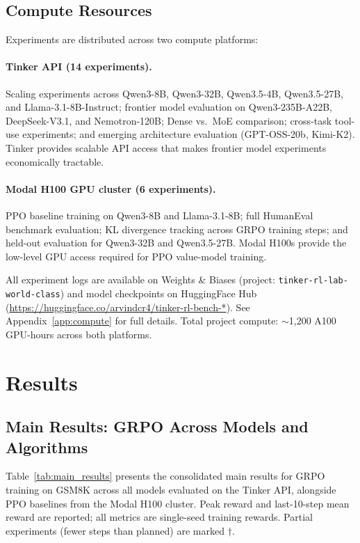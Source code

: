 \documentclass{article}
\begin{document}
\subsection{Compute Resources}

Experiments are distributed across two compute platforms:

\paragraph{Tinker API (14 experiments).}
Scaling experiments across Qwen3-8B, Qwen3-32B, Qwen3.5-4B, Qwen3.5-27B,
and Llama-3.1-8B-Instruct; frontier model evaluation on Qwen3-235B-A22B,
DeepSeek-V3.1, and Nemotron-120B; Dense vs.~MoE comparison; cross-task
tool-use experiments; and emerging architecture evaluation (GPT-OSS-20b,
Kimi-K2). Tinker provides scalable API access that makes frontier model
experiments economically tractable.

\paragraph{Modal H100 GPU cluster (6 experiments).}
PPO baseline training on Qwen3-8B and Llama-3.1-8B; full HumanEval
benchmark evaluation; KL divergence tracking across GRPO training steps;
and held-out evaluation for Qwen3-32B and Qwen3.5-27B. Modal H100s
provide the low-level GPU access required for PPO value-model training.

All experiment logs are available on Weights \& Biases (project:
\texttt{tinker-rl-lab-world-class}) and model checkpoints on HuggingFace
Hub (\url{https://huggingface.co/arvindcr4/tinker-rl-bench-*}).
See Appendix~\ref{app:compute} for full details. Total project compute:
$\sim$1,200 A100 GPU-hours across both platforms.

\section{Results}
\label{sec:results}

\subsection{Main Results: GRPO Across Models and Algorithms}
\label{sec:main_results}

Table~\ref{tab:main_results} presents the consolidated main results for GRPO
training on GSM8K across all models evaluated on the Tinker API, alongside
PPO baselines from the Modal H100 cluster. Peak reward and last-10-step mean
reward are reported; all metrics are single-seed training rewards.
Partial experiments (fewer steps than planned) are marked $\dagger$.
\end{document}

